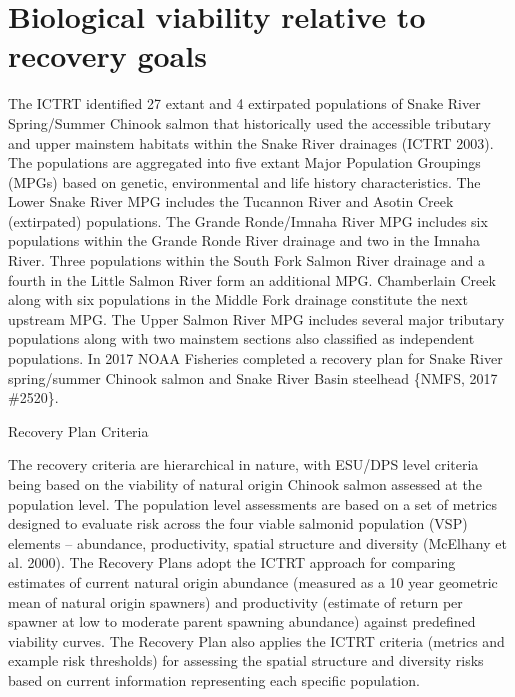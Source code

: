\documentclass[
  letterpaper,
  oneside,
  open=any]{scrbook}
\begin{document}
\hypertarget{biological-viability-relative-to-recovery-goals-2}{%
\section{Biological viability relative to recovery
goals}\label{biological-viability-relative-to-recovery-goals-2}}

The ICTRT identified 27 extant and 4 extirpated populations of Snake
River Spring/Summer Chinook salmon that historically used the accessible
tributary and upper mainstem habitats within the Snake River drainages
(ICTRT 2003). The populations are aggregated into five extant Major
Population Groupings (MPGs) based on genetic, environmental and life
history characteristics. The Lower Snake River MPG includes the Tucannon
River and Asotin Creek (extirpated) populations. The Grande Ronde/Imnaha
River MPG includes six populations within the Grande Ronde River
drainage and two in the Imnaha River. Three populations within the South
Fork Salmon River drainage and a fourth in the Little Salmon River form
an additional MPG. Chamberlain Creek along with six populations in the
Middle Fork drainage constitute the next upstream MPG. The Upper Salmon
River MPG includes several major tributary populations along with two
mainstem sections also classified as independent populations. In 2017
NOAA Fisheries completed a recovery plan for Snake River spring/summer
Chinook salmon and Snake River Basin steelhead \{NMFS, 2017 \#2520\}.

Recovery Plan Criteria

The recovery criteria are hierarchical in nature, with ESU/DPS level
criteria being based on the viability of natural origin Chinook salmon
assessed at the population level. The population level assessments are
based on a set of metrics designed to evaluate risk across the four
viable salmonid population (VSP) elements -- abundance, productivity,
spatial structure and diversity (McElhany et al. 2000). The Recovery
Plans adopt the ICTRT approach for comparing estimates of current
natural origin abundance (measured as a 10 year geometric mean of
natural origin spawners) and productivity (estimate of return per
spawner at low to moderate parent spawning abundance) against predefined
viability curves. The Recovery Plan also applies the ICTRT criteria
(metrics and example risk thresholds) for assessing the spatial
structure and diversity risks based on current information representing
each specific population.
\end{document}
